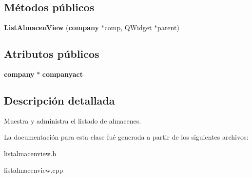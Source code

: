 \subsection*{M\'{e}todos p\'{u}blicos}
\begin{CompactItemize}
\item 
{\bf List\-Almacen\-View} ({\bf company} $\ast$comp, QWidget $\ast$parent)\label{classListAlmacenView_a0}

\end{CompactItemize}
\subsection*{Atributos p\'{u}blicos}
\begin{CompactItemize}
\item 
{\bf company} $\ast$ {\bf companyact}\label{classListAlmacenView_o0}

\end{CompactItemize}


\subsection{Descripci\'{o}n detallada}
Muestra y administra el listado de almacenes. 



La documentaci\'{o}n para esta clase fu\'{e} generada a partir de los siguientes archivos:\begin{CompactItemize}
\item 
listalmacenview.h\item 
listalmacenview.cpp\end{CompactItemize}

